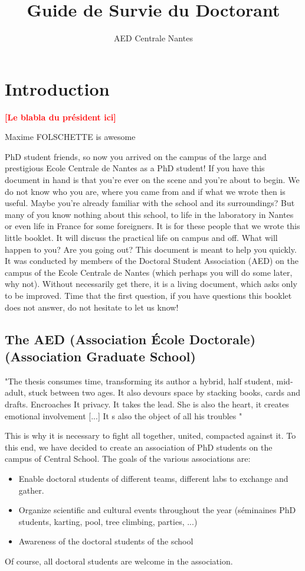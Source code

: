 \documentclass[11pt]{report}
\title{Guide de Survie du Doctorant}
\author{AED Centrale Nantes}
\newcommand{\todo}[1]{\textcolor{red}{\textbf{[#1]}}}
\begin{document}

\setcounter{page}{0}
\tableofcontents

\newpage
\chapter*{Introduction}
\todo{Le blabla du président ici}

Maxime FOLSCHETTE is awesome

PhD student friends, so now you arrived on the campus of the large and prestigious Ecole Centrale de Nantes as a PhD student! If you have this document in hand is that you're ever on the scene and you're about to begin. We do not know who you are, where you came from and if what we wrote then is useful. Maybe you're already familiar with the school and its surroundings? But many of you know nothing about this school, to life in the laboratory in Nantes or even life in France for some foreigners. It is for these people that we wrote this little booklet. It will discuss the practical life on campus and off. What will happen to you? Are you going out? This document is meant to help you quickly. It was conducted by members of the Doctoral Student Association (AED) on the campus of the Ecole Centrale de Nantes (which perhaps you will do some later, why not). Without necessarily get there, it is a living document, which asks only to be improved. Time that the first question, if you have questions this booklet does not answer, do not hesitate to let us know!
\section{The AED (Association École Doctorale) (Association Graduate School)}
"The thesis consumes time, transforming its author a hybrid, half student, mid-adult, stuck between two ages. It also devours space by stacking books, cards and drafts. Encroaches It privacy. It takes the lead. She is also the heart, it creates emotional involvement [...] It s also the object of all his troubles "

This is why it is necessary to fight all together, united, compacted against it. To this end, we have decided to create an association of PhD students on the campus of Central School. The goals of the various associations are:
\begin{itemize}
\item Enable doctoral students of different teams, different labs to exchange and gather.
\item Organize scientific and cultural events throughout the year (séminaines PhD students, karting, pool, tree climbing, parties, ...)
\item Awareness of the doctoral students of the school
\end{itemize}
Of course, all doctoral students are welcome in the association.





\end{document}
